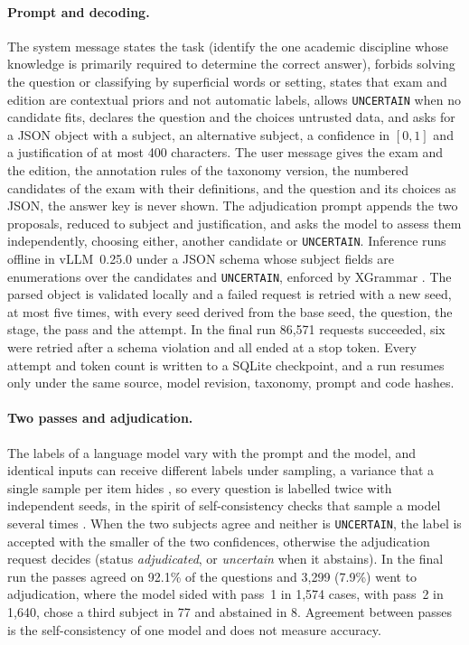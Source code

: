 \paragraph{Prompt and decoding.} The system message states the task
(identify the one academic discipline whose knowledge is primarily required
to determine the correct answer), forbids solving the question or classifying
by superficial words or setting, states that exam and edition are contextual
priors and not automatic labels, allows \texttt{UNCERTAIN} when no candidate
fits, declares the question and the choices untrusted data, and asks for a
JSON object with a subject, an alternative subject, a confidence in $[0,1]$
and a justification of at most 400 characters. The user message gives the
exam and the edition, the annotation rules of the taxonomy version, the
numbered candidates of the exam with their definitions, and the question and
its choices as JSON, the answer key is never shown. The adjudication prompt
appends the two proposals, reduced to subject and justification, and asks the
model to assess them independently, choosing either, another candidate or
\texttt{UNCERTAIN}. Inference runs offline in vLLM~0.25.0 \citep{kwon2023efficient} under a JSON schema
whose subject fields are enumerations over the candidates and
\texttt{UNCERTAIN}, enforced by XGrammar \citep{dong2024xgrammar}. The
parsed object is validated locally and a failed request is retried with a new
seed, at most five times, with every seed derived from the base seed, the
question, the stage, the pass and the attempt. In the final run 86,571
requests succeeded, six were retried after a schema violation and all ended
at a stop token. Every attempt and token count is written to a SQLite
checkpoint, and a run resumes only under the same source, model revision,
taxonomy, prompt and code hashes.

\paragraph{Two passes and adjudication.} The labels of a language model
vary with the prompt and the model, and identical inputs can receive
different labels under sampling, a variance that a single sample per item
hides \citep{song2025good}, so every
question is labelled twice with independent seeds, in the spirit of
self-consistency checks that sample a model several times
\citep{wang2023selfconsistency}. When the two subjects agree and neither is
\texttt{UNCERTAIN}, the label is accepted with the smaller of the two
confidences, otherwise the adjudication request decides (status
\emph{adjudicated}, or \emph{uncertain} when it abstains). In the final run
the passes agreed on 92.1\% of the questions and 3,299 (7.9\%) went to
adjudication, where the model sided with pass~1 in 1,574 cases, with pass~2 in
1,640, chose a third subject in 77 and abstained in 8. Agreement between
passes is the self-consistency of one model and does not measure accuracy.

